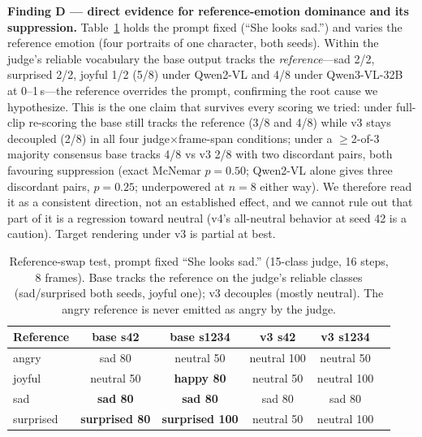 \documentclass{article}
\begin{document}
\textbf{Finding D --- direct evidence for reference-emotion dominance and its suppression.}
Table~\ref{tab:mechanism} holds the prompt fixed (``She looks sad.'') and varies the reference
emotion (four portraits of one character, both seeds). Within the judge's reliable vocabulary the
base output tracks the \emph{reference}---sad 2/2, surprised 2/2, joyful 1/2 (5/8) under Qwen2-VL
and 4/8 under Qwen3-VL-32B at 0--1\,s---the reference overrides the prompt, confirming the root cause
we hypothesize. This is the one claim that survives every scoring we tried: under full-clip
re-scoring the base still tracks the reference (3/8 and 4/8) while v3 stays decoupled (2/8) in all
four judge$\times$frame-span conditions; under a $\ge$2-of-3 majority consensus base tracks 4/8 vs
v3 2/8 with two discordant pairs, both favouring suppression (exact McNemar $p{=}0.50$; Qwen2-VL alone
gives three discordant pairs, $p{=}0.25$; underpowered at $n{=}8$ either way). We therefore read it as a consistent direction, not an
established effect, and we cannot rule out that part of it is a regression toward neutral (v4's
all-neutral behavior at seed 42 is a caution). Target rendering under v3 is partial at best.

\begin{table}[!t]
\centering\small
\caption{Reference-swap test, prompt fixed ``She looks sad.'' (15-class judge, 16 steps, 8
frames). Base tracks the reference on the judge's reliable classes (sad/surprised both seeds,
joyful one); v3 decouples (mostly neutral). The angry reference is never emitted as angry by the
judge.}
\label{tab:mechanism}
\begin{tabular}{@{}lccccc@{}}
\toprule
Reference & base s42 & base s1234 & v3 s42 & v3 s1234\\
\midrule
angry & sad 80 & neutral 50 & neutral 100 & neutral 50\\
joyful & neutral 50 & \textbf{happy 80} & neutral 50 & neutral 100\\
sad & \textbf{sad 80} & \textbf{sad 80} & sad 80 & sad 80\\
surprised & \textbf{surprised 80} & \textbf{surprised 100} & neutral 50 & neutral 100\\
\bottomrule
\end{tabular}
\end{table}
\end{document}
